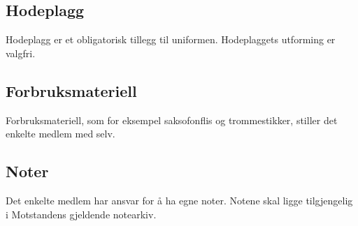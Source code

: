     \subsection{Hodeplagg}
        \begin{statute}
            Hodeplagg er et obligatorisk tillegg til uniformen. Hodeplaggets utforming er valgfri.
        \end{statute}
        
    \subsection{Forbruksmateriell}
        \begin{statute}
            Forbruksmateriell, som for eksempel saksofonflis og trommestikker, stiller det enkelte medlem med selv.
        \end{statute}
        
    \subsection{Noter}
        \begin{statute}
            Det enkelte medlem har ansvar for å ha egne noter. Notene skal ligge tilgjengelig i Motstandens gjeldende notearkiv.
        \end{statute}
     